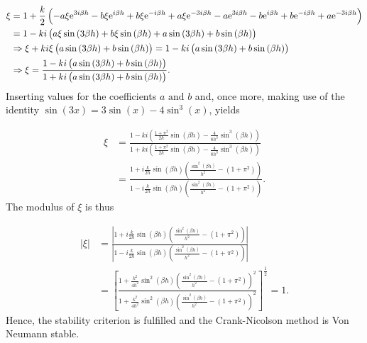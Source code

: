 \begin{equation*}
\begin{split}
    \xi  &= 1+ \frac{k}{2} \left(-a\xi \mathrm{e}^{3i \beta h} -b\xi \mathrm{e}^{i \beta h} + b\xi \mathrm{e}^{-i \beta h}+a\xi \mathrm{e}^{-3 i \beta h} - a\mathrm{e}^{3i \beta h}-b\mathrm{e}^{i \beta h}+b\mathrm{e}^{-i \beta h}+a\mathrm{e}^{-3i \beta h}\right)\\
    &= 1 -k i\left(a\xi \sin{(3 \beta h)} +b\xi \sin{(\beta h)} + a\sin{(3\beta h)}+b\sin{(\beta h)} \right)\\ \vspace{2mm}
    &\Rightarrow \xi + k i \xi \left(a \sin{(3\beta h)}+b\sin{(\beta h)}\right) = 1 - ki\left(a\sin{(3\beta h)+b\sin{(\beta h)}} \right)\\
    &\Rightarrow \xi = \frac{1 -ki\left(a \sin{(3\beta h)}+b\sin{(\beta h)}\right)}{1+ki\left(a\sin{(3\beta h)}+b\sin{(\beta h)}\right)}.
\end{split}
\end{equation*}
Inserting values for the coefficients $a \text{ and }b$ and, once more, making use of the identity $\sin{(3x)} = 3\sin{(x)} - 4\sin^3{(x)}$, yields

\begin{equation*}
    \begin{split}
        \xi &= \frac{1-ki\left(\frac{1+\pi^2}{2h}\sin{(\beta h)}-\frac{4}{8h^3}\sin^3{(\beta h)}\right)}{1+ki\left( \frac{1+\pi^2}{2h}\sin{(\beta h)}-\frac{4}{8h^3}\sin^3{(\beta h)}\right)}\\
        & = \frac{1+i\frac{k}{2h}\sin{(\beta h)}\left(\frac{\sin^2{(\beta h)}}{h^2}-(1+\pi^2)\right)}{1-i\frac{k}{2h}\sin{(\beta h)}\left(\frac{\sin^2{(\beta h)}}{h^2}-(1+\pi^2)\right)}.
    \end{split}
\end{equation*}
The modulus of $\xi$ is thus

\begin{equation*}
    \begin{split}
        |\xi| &= \frac{|1+i\frac{k}{2h}\sin{(\beta h)}\left(\frac{\sin^2{(\beta h)}}{h^2}-(1+\pi^2)\right)|}{|1-i\frac{k}{2h}\sin{(\beta h)}\left(\frac{\sin^2{(\beta h)}}{h^2}-(1+\pi^2)\right)|}\\
        &= \left[\frac{1+\frac{k^2}{4h^2}\sin^2{(\beta h)}\left(\frac{\sin^2{(\beta h)}}{h^2}-(1+\pi^2)\right)^2}{1+\frac{k^2}{4h^2}\sin^2{(\beta h)}\left(\frac{\sin^2{(\beta h)}}{h^2}-(1+\pi^2)\right)^2}\right]^{\frac{1}{2}} = 1.
    \end{split}
\end{equation*}
Hence, the stability criterion is fulfilled and the Crank-Nicolson method is Von Neumann stable. 

